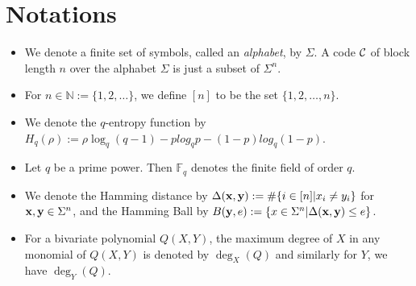 

	
	\large
	
	\pagestyle{empty}
	
	
%			
%
%
	
	\newpage
	
	\tableofcontents	
	
	\newpage
	
	\section*{Notations}
	
	
	\begin{itemize}
		\item We denote a finite set of symbols, called an \emph{alphabet}, by $\Sigma$. A code $\mathcal{C}$ of block length $n$ over the alphabet $\Sigma$ is just a subset of $\Sigma^n$.
		
		\item For $n\in\mathbb{N} := \{1,2,\ldots\}$, we define $[n]$ to be the set $\{1,2,\ldots,n\}$.
		
		\item  We denote the $q$-entropy function by $H_q(\rho) := \rho \log_q(q-1) - plog_qp - (1-p)log_q(1-p)$.
		
		\item  Let $q$ be a prime power. Then $\mathbb{F}_q$ denotes the finite field of order $q$.
		
		\item We denote the Hamming distance by $\Delta(\mathbf{x},\mathbf{y}) := \#\{i\in[n] | x_i \neq y_i\}$ for $\mathbf{x}, \mathbf{y}\in\Sigma^n$, and the Hamming Ball by $B(\mathbf{y},e):=\{x\in\Sigma^n | \Delta(\mathbf{x},\mathbf{y})\leq e\}$.
		
		\item For a bivariate polynomial $Q(X,Y)$, the maximum degree of $X$ in any monomial of $Q(X,Y)$ is denoted by $\deg_X(Q)$ and similarly for $Y$, we have $\deg_Y(Q)$.
		
		\vfill
		
		
	\end{itemize}
	
